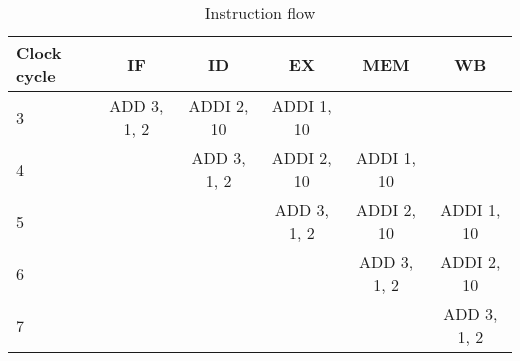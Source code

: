 \begin{table}[H]
\center
\begin{tabular}{|l | c | c | c | c |c|}
    \hline
    Clock cycle & IF & ID & EX & MEM & WB \\
    \hline
    3 & ADD 3, 1, 2  & ADDI 2, 10 & ADDI 1, 10   &              &              \\
    4 &              & ADD 3, 1, 2  & ADDI 2, 10    & ADDI 1, 10   &              \\
    5 &              &              & ADD 3, 1, 2   & ADDI 2, 10   & ADDI 1, 10    \\
    6 &              &              &               & ADD 3, 1, 2  & ADDI 2, 10    \\
    7 &              &              &               &              & ADD 3, 1, 2  \\
    \hline
\end{tabular}
\caption{Instruction flow}
\label{testing:tbl:instrflow}
\end{table}



